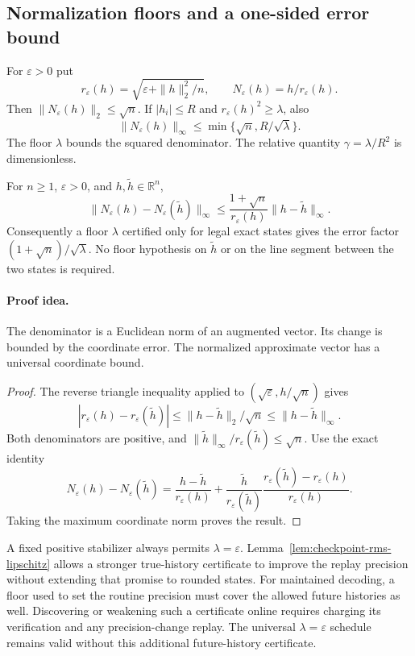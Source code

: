 \subsection{Normalization floors and a one-sided error bound}

For $\varepsilon>0$ put
\[
 r_\varepsilon(h)=
   \sqrt{\varepsilon+\|h\|_2^2/n},\qquad
 N_\varepsilon(h)=h/r_\varepsilon(h).
\]
Then $\|N_\varepsilon(h)\|_2\le\sqrt n$.
If $|h_i|\le R$ and $r_\varepsilon(h)^2\ge\lambda$, also
\[
 \|N_\varepsilon(h)\|_\infty
 \le \min\{\sqrt n,R/\sqrt\lambda\}.
\]
The floor $\lambda$ bounds the squared denominator. The relative
quantity $\gamma=\lambda/R^2$ is dimensionless.

\begin{lemma}
\label{lem:checkpoint-rms-lipschitz}
For $n\ge1$, $\varepsilon>0$, and $h,\widetilde h\in\mathbb R^n$,
\[
 \|N_\varepsilon(h)-N_\varepsilon(\widetilde h)\|_\infty
 \le
 \frac{1+\sqrt n}{r_\varepsilon(h)}
          \|h-\widetilde h\|_\infty.
\]
Consequently a floor $\lambda$ certified only for legal exact
states gives the error factor $(1+\sqrt n)/\sqrt\lambda$.
No floor hypothesis on $\widetilde h$ or on the line segment
between the two states is required.
\end{lemma}

\paragraph{Proof idea.}
The denominator is a Euclidean norm of an augmented vector.
Its change is bounded by the coordinate error. The normalized
approximate vector has a universal coordinate bound.

\begin{proof}
The reverse triangle inequality applied to
$(\sqrt\varepsilon,h/\sqrt n)$ gives
\[
 |r_\varepsilon(h)-r_\varepsilon(\widetilde h)|
 \le \|h-\widetilde h\|_2/\sqrt n
 \le \|h-\widetilde h\|_\infty.
\]
Both denominators are positive, and
$\|\widetilde h\|_\infty/r_\varepsilon(\widetilde h)\le\sqrt n$.
Use the exact identity
\[
 N_\varepsilon(h)-N_\varepsilon(\widetilde h)
 =\frac{h-\widetilde h}{r_\varepsilon(h)}
  +\frac{\widetilde h}{r_\varepsilon(\widetilde h)}
   \frac{r_\varepsilon(\widetilde h)-r_\varepsilon(h)}
        {r_\varepsilon(h)}.
\]
Taking the maximum coordinate norm proves the result.
\end{proof}

A fixed positive stabilizer always permits $\lambda=\varepsilon$.
Lemma~\ref{lem:checkpoint-rms-lipschitz}
allows a stronger true-history certificate to improve the replay
precision without extending that promise to rounded states.
For maintained decoding, a floor used to set the routine precision
must cover the allowed future histories as well. Discovering or
weakening such a certificate online requires charging its
verification and any precision-change replay. The universal
$\lambda=\varepsilon$ schedule remains valid without this
additional future-history certificate.

